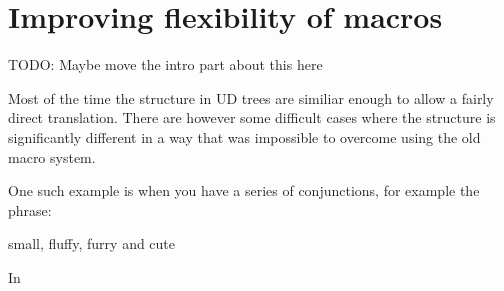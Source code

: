 \chapter{Improving flexibility of macros}

TODO: Maybe move the intro part about this here

Most of the time the structure in UD trees are similiar enough to allow a fairly direct translation.
There are however some difficult cases where the structure is significantly different in a way that was impossible to overcome using the old macro system.

One such example is when you have a series of conjunctions, for example the phrase:

  small, fluffy, furry and cute

In 
